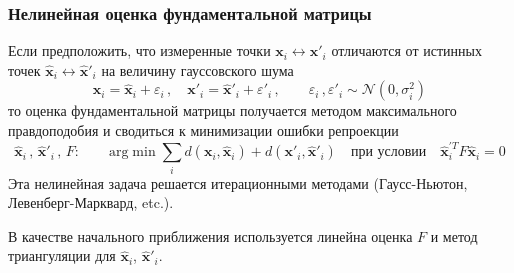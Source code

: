 \documentclass[12pt,notheorems,usepdftitle=false,aspectratio=1610]{beamer}
\theoremstyle{definition} %
\begin{document}
\begin{frame}
\frametitle{Нелинейная оценка фундаментальной матрицы}
Если предположить, что измеренные точки $\mathbf{x}_i\leftrightarrow\mathbf{x}'_i$
отличаются от истинных точек $\widehat{\mathbf{x}}_i\leftrightarrow\widehat{\mathbf{x}}'_i$ на величину гауссовского шума
$$
    \mathbf{x}_i=\widehat{\mathbf{x}}_i+\varepsilon_i\,,\quad
    \mathbf{x}'_i=\widehat{\mathbf{x}}'_i+\varepsilon'_i\,,\qquad
    \varepsilon_i\,,\varepsilon'_i\sim\mathcal{N}(0, \sigma_i^2)
$$
то оценка фундаментальной матрицы получается методом максимального правдоподобия и сводиться к минимизации
ошибки репроекции
$$
    \widehat{\mathbf{x}}_i\,,\,
    \widehat{\mathbf{x}}'_i\,,\,
    F:\qquad
    \mathrm{arg}\min\sum_i
    d\left(\mathbf{x}_i,\widehat{\mathbf{x}}_i\right)+
    d\left(\mathbf{x}'_i,\widehat{\mathbf{x}}'_i\right)
    \quad\mbox{при условии}\quad
    \widehat{\mathbf{x}}^{'T}_iF\widehat{\mathbf{x}}_i=0
$$
Эта нелинейная задача решается итерационными методами (Гаусс-Ньютон, Левенберг-Марквард, etc.).
\vspace{0.5cm}

В качестве начального приближения используется линейна оценка $F$ и метод триангуляции для 
$\widehat{\mathbf{x}}_i$, $\widehat{\mathbf{x}}'_i$.
\end{frame}
\end{document}
